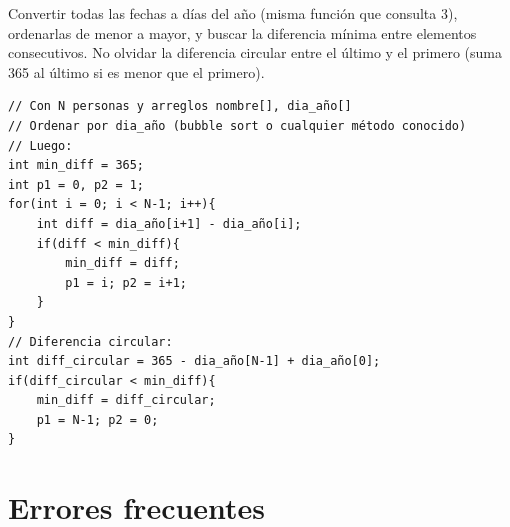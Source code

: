 \documentclass[12pt, oneside]{article}
\begin{document}
\begin{notaprofesor}
  Convertir todas las fechas a días del año (misma función que consulta 3),
  ordenarlas de menor a mayor, y buscar la diferencia mínima entre
  elementos consecutivos.  No olvidar la diferencia circular entre el
  último y el primero (suma 365 al último si es menor que el primero).
\begin{verbatim}
// Con N personas y arreglos nombre[], dia_año[]
// Ordenar por dia_año (bubble sort o cualquier método conocido)
// Luego:
int min_diff = 365;
int p1 = 0, p2 = 1;
for(int i = 0; i < N-1; i++){
    int diff = dia_año[i+1] - dia_año[i];
    if(diff < min_diff){
        min_diff = diff;
        p1 = i; p2 = i+1;
    }
}
// Diferencia circular:
int diff_circular = 365 - dia_año[N-1] + dia_año[0];
if(diff_circular < min_diff){
    min_diff = diff_circular;
    p1 = N-1; p2 = 0;
}
\end{verbatim}
\end{notaprofesor}

\section{Errores frecuentes}
\end{document}
